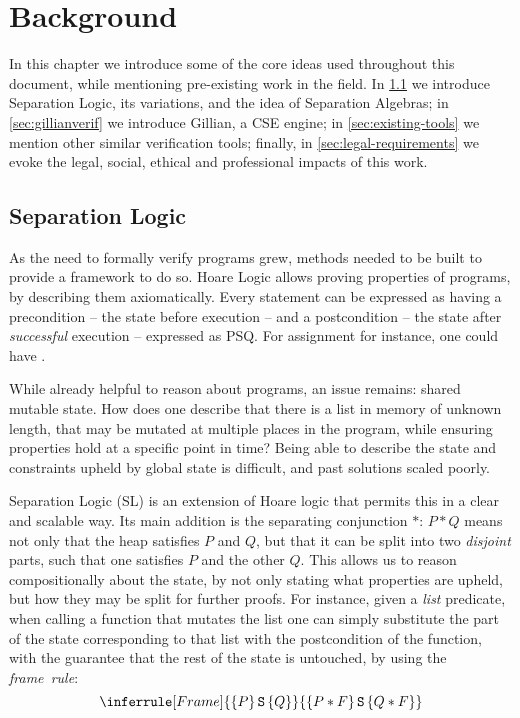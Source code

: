 \chapter{Background} \label{chap:background}

In this chapter we introduce some of the core ideas used throughout this document, while mentioning pre-existing work in the field. In \cref{sec:separationlogic} we introduce Separation Logic, its variations, and the idea of Separation Algebras; in \cref{sec:gillianverif} we introduce Gillian, a CSE engine; in \cref{sec:existing-tools} we mention other similar verification tools; finally, in \cref{sec:legal-requirements} we evoke the legal, social, ethical and professional impacts of this work.

\section{Separation Logic} \label{sec:separationlogic}

As the need to formally verify programs grew, methods needed to be built to provide a framework to do so. Hoare Logic \cite{hoarelogic} allows proving properties of programs, by describing them axiomatically. Every statement can be expressed as having a precondition -- the state before execution -- and a postcondition -- the state after \emph{successful} execution -- expressed as \SLtriple PSQ. For assignment for instance, one could have .

While already helpful to reason about programs, an issue remains: shared mutable state. How does one describe that there is a list in memory of unknown length, that may be mutated at multiple places in the program, while ensuring properties hold at a specific point in time? Being able to describe the state and constraints upheld by global state is difficult, and past solutions scaled poorly.

Separation Logic (SL) \cite{seplogic1, seplogic2} is an extension of Hoare logic that permits this in a clear and scalable way. Its main addition is the separating conjunction $*$: $P * Q$ means not only that the heap satisfies $P$ and $Q$, but that it can be split into two \emph{disjoint} parts, such that one satisfies $P$ and the other $Q$. This allows us to reason compositionally about the state, by not only stating what properties are upheld, but how they may be split for further proofs. For instance, given a \emph{list} predicate, when calling a function that mutates the list one can simply substitute the part of the state corresponding to that list with the postcondition of the function, with the guarantee that the rest of the state is untouched, by using the \emph{frame~rule}:
\[
\inferrule[Frame]
	{\SLtriple{P}{S}{Q}}
	{\SLtriple{P*F}{S}{Q*F}}
\]

